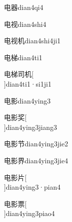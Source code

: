 \begin{verbete}[5;16]{电器}{dian4qi4}
\end{verbete}

\begin{verbete}[5;8]{电视}{dian4shi4}
\end{verbete}

\begin{verbete}[5;8;6]{电视机}{dian4shi4ji1}
\end{verbete}

\begin{verbete}[5;11]{电梯}{dian4ti1}
\end{verbete}

\begin{verbete}[5;11;5;6]{电梯司机}[\\]{dian4ti1·si1ji1}
\end{verbete}

\begin{verbete}[5;15]{电影}{dian4ying3}
\end{verbete}

\begin{verbete}[5;15;9]{电影奖}[\\]{dian4ying3jiang3}
\end{verbete}

\begin{verbete}[5;15;5]{电影节}{dian4ying3jie2}
\end{verbete}

\begin{verbete}[5;15;9]{电影界}{dian4ying3jie4}
\end{verbete}

\begin{verbete}[5;15;4]{电影片}[\\]{dian4ying3·pian4}
\end{verbete}

\begin{verbete}[5;15;11]{电影票}[\\]{dian4ying3piao4}
\end{verbete}

